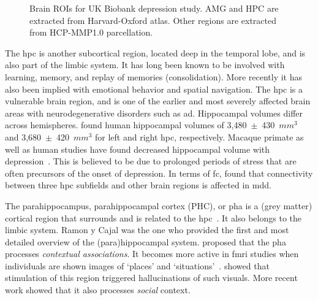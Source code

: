 \begin{figure}[t]
  \hspace{0.08\textwidth}
  \caption{
    Brain ROIs for UK Biobank depression study.
    AMG and HPC are extracted from Harvard-Oxford atlas.
    Other regions are extracted from HCP-MMP1.0 parcellation.
  }\label{fig:ukb-brain-regions}
\end{figure}


The \gls{hpc} is another subcortical region, located deep in the temporal lobe, and is also part of the limbic system.
It has long been known to be involved with learning, memory, and replay of memories (consolidation).
More recently it has also been implied with emotional behavior and spatial navigation.
The \gls{hpc} is a vulnerable brain region, and is one of the earlier and most severely affected brain areas with neurodegenerative disorders such as \gls{ad}.
Hippocampal volumes differ across hemispheres.
\textcite{McHugh2007} found human hippocampal volumes of 3,480~$\pm$~430~$mm^3$ and 3,680~$\pm$~420~$mm^3$ for left and right \gls{hpc}, respectively.
Macaque primate as well as human studies have found decreased hippocampal volume with depression~\parencite{Campbell2004, Malykhin2010, Brown2014, Schmaal2016}.
This is believed to be due to prolonged periods of stress that are often precursors of the onset of depression.
In terms of \gls{fc}, \textcite{Hao2020} found that connectivity between three \gls{hpc} subfields and other brain regions is affected in \gls{mdd}.

The parahippocampus, parahippocampal cortex (PHC), or \gls{pha} is a (grey matter) cortical region that surrounds and is related to the \gls{hpc}~\parencite{Burwell2000}.
It also belongs to the limbic system.
Ramon y Cajal was the one who provided the first and most detailed overview of the (para)hippocampal system.
\textcite{Aminoff2013} proposed that the \gls{pha} processes \emph{contextual associations}.
It becomes more active in \gls{fmri} studies when individuals are shown images of `places' and `situations'~\parencite{Epstein1998}.
\textcite{Megevand2014} showed that stimulation of this region triggered hallucinations of such visuals.
More recent work showed that it also processes \emph{social} context.

